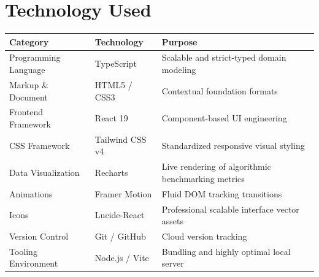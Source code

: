 \documentclass[a4paper]{article}
\begin{document}
\section{Technology Used}
\begin{table}[h]
\centering
\begin{tabular}{@{}lll@{}}
\toprule
\textbf{Category} & \textbf{Technology} & \textbf{Purpose} \\ \midrule
Programming Language & TypeScript & Scalable and strict-typed domain modeling \\
Markup \& Document & HTML5 / CSS3 & Contextual foundation formats \\
Frontend Framework & React 19 & Component-based UI engineering \\
CSS Framework & Tailwind CSS v4 & Standardized responsive visual styling \\
Data Visualization & Recharts & Live rendering of algorithmic benchmarking metrics \\
Animations & Framer Motion & Fluid DOM tracking transitions \\
Icons & Lucide-React & Professional scalable interface vector assets \\
Version Control & Git / GitHub & Cloud version tracking \\
Tooling Environment & Node.js / Vite & Bundling and highly optimal local server \\ \bottomrule
\end{tabular}
\end{table}
\end{document}
